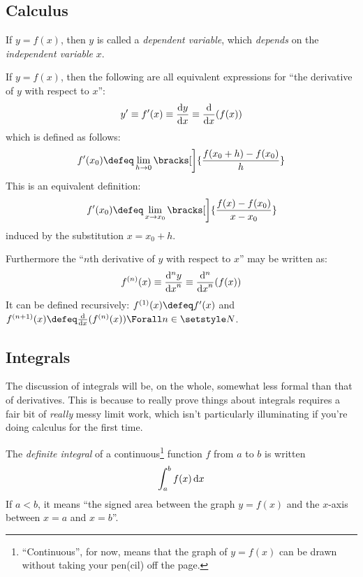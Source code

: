 \subsection*{Calculus}

If \(y = f(x)\), then \(y\) is called a \emph{dependent variable}, which
\emph{depends} on the \emph{independent variable} \(x\).

If \(y = f(x)\), then the following are all equivalent expressions for ``the
derivative of \(y\) with respect to \(x\)'':
\begin{equation*}
 y'
 \equiv f'(x)
 \equiv \dv<y>{x}
 \equiv \dv{x}(f(x))
\end{equation*}
which is defined as follows:
\begin{equation*}
 f'(x_0) \defeq
  \lim_{h \to 0}
   \bracks[\bigg]{
    \frac{f(x_0 + h) - f(x_0)} h
   }
\end{equation*}
This is an equivalent definition:
\begin{equation*}
 f'(x_0) \defeq
  \lim_{x \to x_0}
  \bracks[\bigg]{
   \frac{f(x) - f(x_0)}{x - x_0}
  }
\end{equation*}
induced by the substitution \(x = x_0 + h\).

Furthermore the ``\(n\)th derivative of \(y\) with respect to \(x\)'' may be
written as:
\begin{equation*}
 f^{(n)}(x)
 \equiv \dv[n]<y>{x}
 \equiv \dv[n]{x}(f(x))
\end{equation*}
It can be defined recursively: \(f^{(1)}(x) \defeq f'(x)\) and
\(f^{(n + 1)}(x) \defeq \dv{x}(f^{(n)}(x)) \Forall n \in \Naturals\).

\subsection*{Integrals}

The discussion of integrals will be, on the whole, somewhat less formal than
that of derivatives. This is because to really prove things about integrals
requires a fair bit of \emph{really} messy limit work, which isn't particularly
illuminating if you're doing calculus for the first time.

The \emph{definite integral} of a continuous\footnote{
 ``Continuous'', for now, means that the graph of \(y = f(x)\) can be drawn
 without taking your pen(cil) off the page.
} function \(f\) from \(a\) to \(b\)
is written
\begin{equation*}
 \integ[a]<b>{f(x)}{x}
\end{equation*}
If \(a < b\), it means ``the signed area between the graph \(y = f(x)\) and the
\(x\)-axis between \(x = a\) and \(x = b\)''.

